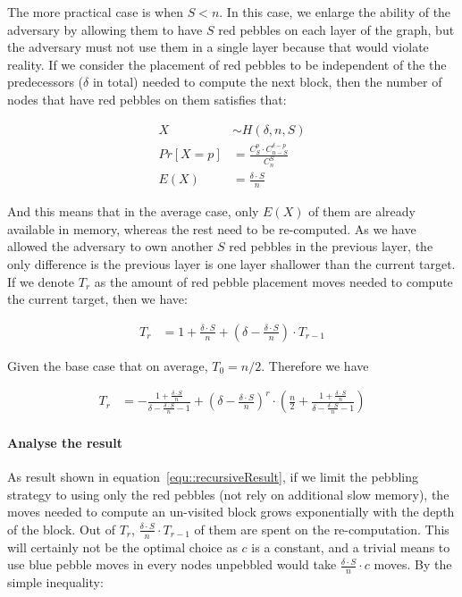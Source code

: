 \documentclass[a4paper]{article}
\begin{document}
The more practical case is when $S < n$. In this case, we enlarge the ability
of the adversary by allowing them to have $S$ red pebbles on each layer of the graph, but the adversary must not use them in a
single layer because that would violate reality.
If we consider the placement of red pebbles to be independent of the the predecessors
($\delta$ in total) needed to compute the next block, then the number of nodes that have red pebbles on them satisfies that:

\begin{align}
  X &\sim H(\delta, n, S)\label{equ::distribution} \\
  Pr[X = p] &= \frac{C_{S}^{p} \cdot C_{n-S}^{\delta - p}}{C_{n}^{S}}\label{equ::distribution2} \\
  E(X) &= \frac{\delta \cdot S}{n}\label{equ::expectation}
\end{align}

And this means that in the average case, only $E(X)$ of them are already available in memory, whereas the rest need to
be re-computed. As we have allowed the adversary to own another $S$ red pebbles in the previous layer, the only difference
is the previous layer is one layer shallower than the current target. If we denote $T_r$ as the amount of red pebble placement moves
needed to compute the current target, then we have:

\begin{align}
  T_{r} &= 1 + \frac{\delta \cdot S}{n} + (\delta - \frac{\delta \cdot S}{n}) \cdot T_{r - 1}\label{equ::recursiveExpr}
\end{align}

Given the base case that on average, $T_0 = n/2$. %
Therefore we have

\newcommand{\myex}{\frac{\delta \cdot S}{n}}
\newcommand{\mya}{\frac{1 + \myex}{\delta - \myex - 1}}

\begin{align}
  T_{r} &= -\mya + (\delta - \frac{\delta \cdot S}{n})^r \cdot (\frac{n}{2} + \mya)\label{equ::recursiveResult}
\end{align}

\paragraph{Analyse the result}
As result shown in equation~\ref{equ::recursiveResult}, if we limit the pebbling strategy to using only the
red pebbles (not rely on additional slow memory), the moves needed to compute an un-visited block grows
exponentially with the depth of the block. Out of $T_{r}$, $\myex \cdot T_{r - 1}$ of them are spent on the
re-computation. This will certainly not be the optimal choice as $c$ is a constant, and a trivial means to
use blue pebble moves in every nodes unpebbled would take $\myex \cdot c$ moves. By the simple inequality:
\end{document}
